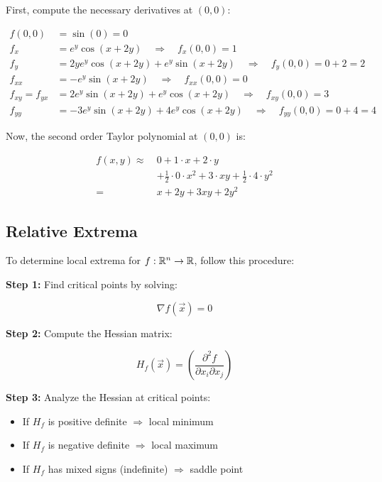 First, compute the necessary derivatives at \( (0, 0) \):

\begin{align*}
    f(0, 0) &= \sin(0) = 0 \\
    f_x &= e^y \cos(x + 2y) \quad \Rightarrow \quad f_x(0, 0) = 1 \\
    f_y &= 2y e^y \cos(x + 2y) + e^y \sin(x + 2y) \quad \Rightarrow \quad f_y(0, 0) = 0 + 2 = 2 \\
    f_{xx} &= -e^y \sin(x + 2y) \quad \Rightarrow \quad f_{xx}(0, 0) = 0 \\
    f_{xy} = f_{yx} &= 2e^y \sin(x + 2y) + e^y \cos(x +2y) \quad \Rightarrow \quad f_{xy}(0, 0) = 3 \\
    f_{yy} &= -3 e^y \sin(x + 2y) + 4e^y \cos(x + 2y) \quad \Rightarrow \quad f_{yy}(0, 0) = 0 + 4 = 4
\end{align*}


Now, the second order Taylor polynomial at \( (0, 0) \) is:

\begin{align*}
    f(x, y) \approx\ & 0 + 1 \cdot x + 2 \cdot y \\
    &+ \frac{1}{2} \cdot 0 \cdot x^2 + 3 \cdot x y + \frac{1}{2} \cdot 4 \cdot y^2 \\
    =\, & x + 2y + 3xy + 2y^2
\end{align*}


\subsection{Relative Extrema}

To determine local extrema for \( f : \mathbb{R}^n \to \mathbb{R} \), follow this procedure:

\textbf{Step 1:} Find critical points by solving:

\[
    \nabla f(\vec{x}) = 0
\]

\textbf{Step 2:} Compute the Hessian matrix:

\[
    H_f(\vec{x}) = \left( \frac{\partial^2 f}{\partial x_i \partial x_j} \right)
\]

\textbf{Step 3:} Analyze the Hessian at critical points:

\begin{itemize}

    \item If \( H_f \) is positive definite \( \Rightarrow \) local minimum

    \item If \( H_f \) is negative definite \( \Rightarrow \) local maximum

    \item If \( H_f \) has mixed signs (indefinite) \( \Rightarrow \) saddle point

\end{itemize}

